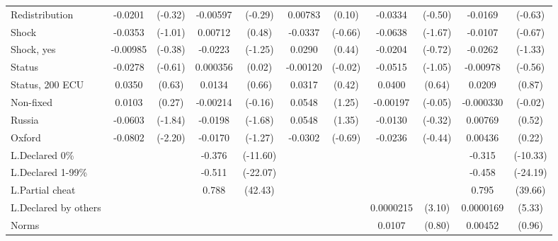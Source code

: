 {\begin{tabular}{l*{5}{cc}}
Redistribution  &  -0.0201         &  (-0.32)& -0.00597         &  (-0.29)&  0.00783         &   (0.10)&  -0.0334         &  (-0.50)&  -0.0169         &  (-0.63)\\
Shock           &  -0.0353         &  (-1.01)&  0.00712         &   (0.48)&  -0.0337         &  (-0.66)&  -0.0638         &  (-1.67)&  -0.0107         &  (-0.67)\\
Shock, yes      & -0.00985         &  (-0.38)&  -0.0223         &  (-1.25)&   0.0290         &   (0.44)&  -0.0204         &  (-0.72)&  -0.0262         &  (-1.33)\\
Status          &  -0.0278         &  (-0.61)& 0.000356         &   (0.02)& -0.00120         &  (-0.02)&  -0.0515         &  (-1.05)& -0.00978         &  (-0.56)\\
Status, 200 ECU &   0.0350         &   (0.63)&   0.0134         &   (0.66)&   0.0317         &   (0.42)&   0.0400         &   (0.64)&   0.0209         &   (0.87)\\
Non-fixed       &   0.0103         &   (0.27)& -0.00214         &  (-0.16)&   0.0548         &   (1.25)& -0.00197         &  (-0.05)&-0.000330         &  (-0.02)\\
Russia          &  -0.0603         &  (-1.84)&  -0.0198         &  (-1.68)&   0.0548         &   (1.35)&  -0.0130         &  (-0.32)&  0.00769         &   (0.52)\\
Oxford          &  -0.0802\sym{*}  &  (-2.20)&  -0.0170         &  (-1.27)&  -0.0302         &  (-0.69)&  -0.0236         &  (-0.44)&  0.00436         &   (0.22)\\
L.Declared 0\%  &                  &         &   -0.376\sym{***}& (-11.60)&                  &         &                  &         &   -0.315\sym{***}& (-10.33)\\
L.Declared 1-99\%&                  &         &   -0.511\sym{***}& (-22.07)&                  &         &                  &         &   -0.458\sym{***}& (-24.19)\\
L.Partial cheat &                  &         &    0.788\sym{***}&  (42.43)&                  &         &                  &         &    0.795\sym{***}&  (39.66)\\
L.Declared by others&                  &         &                  &         &                  &         &0.0000215\sym{**} &   (3.10)&0.0000169\sym{***}&   (5.33)\\
Norms           &                  &         &                  &         &                  &         &   0.0107         &   (0.80)&  0.00452         &   (0.96)\\

\end{tabular}}
